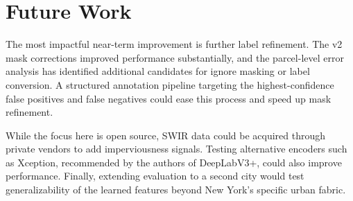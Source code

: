 \section{Future Work}
\label{sec:future_work}

The most impactful near-term improvement is further label refinement. The v2 mask corrections improved performance substantially, and the parcel-level error analysis has identified additional candidates for ignore masking or label conversion. A structured annotation pipeline targeting the highest-confidence false positives and false negatives could ease this process and speed up mask refinement.

While the focus here is open source, SWIR data could be acquired through private vendors to add imperviousness signals. Testing alternative encoders such as Xception, recommended by the authors of DeepLabV3+, could also improve performance. Finally, extending evaluation to a second city would test generalizability of the learned features beyond New York's specific urban fabric.

